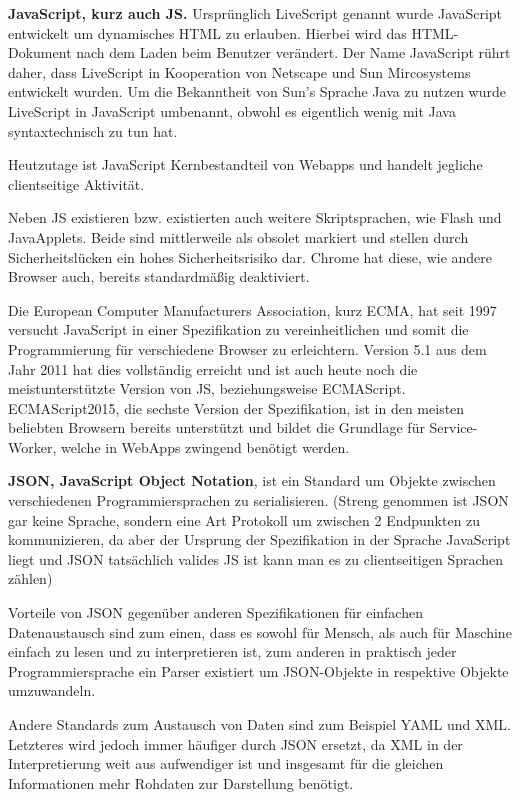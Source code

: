 \documentclass[a4paper,12pt,ngerman,listof=numbered]{scrartcl}      %
\let\oldcite\cite
\renewcommand{\cite}[1]{\textsuperscript{\oldcite{#1}}}
\newcommand{\spacer}{\par\bigskip\noindent}
\begin{document}
	\spacer\textbf{JavaScript, kurz auch JS.} Ursprünglich LiveScript genannt wurde JavaScript entwickelt um dynamisches HTML zu erlauben. Hierbei wird das HTML-Dokument nach dem Laden beim Benutzer verändert. Der Name JavaScript rührt daher, dass LiveScript in Kooperation von Netscape und Sun Mircosystems entwickelt wurden. Um die Bekanntheit von Sun's Sprache Java zu nutzen wurde LiveScript in JavaScript umbenannt, obwohl es eigentlich wenig mit Java syntaxtechnisch zu tun hat. \cite{jsWiki}\par
	Heutzutage ist JavaScript Kernbestandteil von Webapps und handelt jegliche clientseitige Aktivität.\par
	Neben JS existieren bzw. existierten auch weitere Skriptsprachen, wie Flash und JavaApplets. Beide sind mittlerweile als obsolet markiert und stellen durch Sicherheitslücken ein hohes Sicherheitsrisiko dar.\cite{flashPlayer} Chrome hat diese, wie andere Browser auch, bereits standardmäßig deaktiviert.\cite{chromeNoFlash}\par
	Die European Computer Manufacturers Association, kurz ECMA, hat seit 1997 versucht JavaScript in einer Spezifikation zu vereinheitlichen und somit die Programmierung für verschiedene Browser zu erleichtern. Version 5.1 aus dem Jahr 2011 hat dies vollständig erreicht und ist auch heute noch die meistunterstützte Version von JS, beziehungsweise ECMAScript. ECMAScript2015, die sechste Version der Spezifikation, ist in den meisten beliebten Browsern bereits unterstützt und bildet die Grundlage für Service-Worker, welche in WebApps zwingend benötigt werden.\cite{wikiECMA} \par
	
	\spacer\textbf{JSON, JavaScript Object Notation}, ist ein Standard um Objekte zwischen verschiedenen Programmiersprachen zu serialisieren. (Streng genommen ist JSON gar keine Sprache, sondern eine Art Protokoll um zwischen 2 Endpunkten zu kommunizieren, da aber der Ursprung der Spezifikation in der Sprache JavaScript liegt und JSON tatsächlich valides JS ist kann man es zu clientseitigen Sprachen zählen)\par
	Vorteile von JSON gegenüber anderen Spezifikationen für einfachen Datenaustausch sind zum einen, dass es sowohl für Mensch, als auch für Maschine einfach zu lesen und zu interpretieren ist, zum anderen in praktisch jeder Programmiersprache ein Parser existiert um JSON-Objekte in respektive Objekte umzuwandeln.\cite{json}\par
	Andere Standards zum Austausch von Daten sind zum Beispiel YAML und XML. Letzteres wird jedoch immer häufiger durch JSON ersetzt, da XML in der Interpretierung weit aus aufwendiger ist und insgesamt für die gleichen Informationen mehr Rohdaten zur Darstellung benötigt.\par
	
\end{document}
